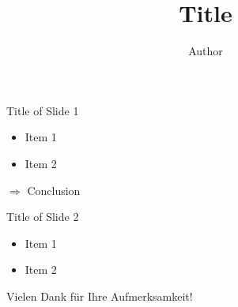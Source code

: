 \documentclass[12pt]{beamer}
\author{Author}
\title{Title}
\begin{document}
\begin{frame}
\titlepage
\end{frame}


\begin{frame}{Title of Slide 1}
\begin{itemize}
\item Item 1	\pause
\item Item 2	\pause
\end{itemize}	\pause
\( \Rightarrow \)  Conclusion
\end{frame}

\begin{frame}{Title of Slide 2}
\begin{itemize}
\item Item 1	\pause
\item Item 2	\pause
\end{itemize}
\end{frame}

\begin{frame}
\begin{center}
\begin{Huge}
Vielen Dank für Ihre Aufmerksamkeit!
\end{Huge}
\end{center}
\end{frame}
\end{document}
